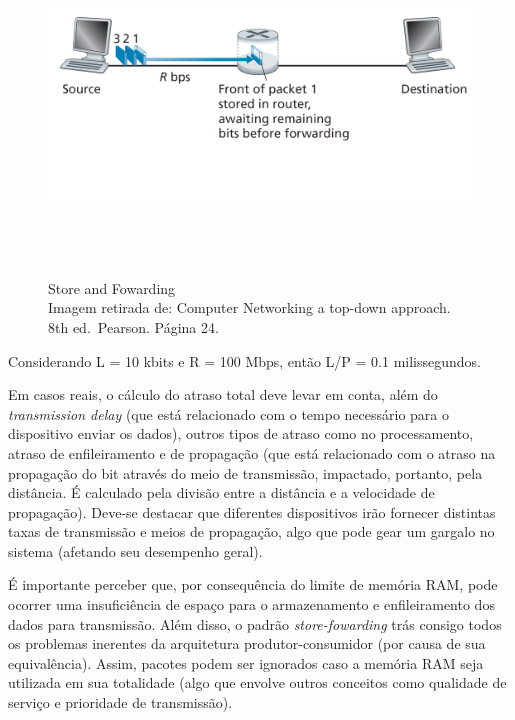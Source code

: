 \begin{figure}[h!]
\centering
\includegraphics[keepaspectratio, width=12cm, height=9cm]{imagens/08/08 - store-and-forwarding.png}
\caption{Store and Fowarding \\
Imagem retirada de: Computer Networking a top-down approach. 8th
ed.~Pearson. Página 24. \\}
\label{fig:Store and Fowarding}
\end{figure}



Considerando L = 10 kbits e R = 100 Mbps, então L/P = 0.1 milissegundos.

Em casos reais, o cálculo do atraso total deve levar em conta, além do
\emph{transmission delay} (que está relacionado com o tempo necessário
para o dispositivo enviar os dados), outros tipos de atraso como no
processamento, atraso de enfileiramento e de propagação (que está
relacionado com o atraso na propagação do bit através do meio de
transmissão, impactado, portanto, pela distância. É calculado pela
divisão entre a distância e a velocidade de propagação). Deve-se
destacar que diferentes dispositivos irão fornecer distintas taxas de
transmissão e meios de propagação, algo que pode gear um gargalo no
sistema (afetando seu desempenho geral).

É importante perceber que, por consequência do limite de memória RAM,
pode ocorrer uma insuficiência de espaço para o armazenamento e
enfileiramento dos dados para transmissão. Além disso, o padrão
\emph{store-fowarding} trás consigo todos os problemas inerentes da
arquitetura produtor-consumidor (por causa de sua equivalência). Assim,
pacotes podem ser ignorados caso a memória RAM seja utilizada em sua
totalidade (algo que envolve outros conceitos como qualidade de serviço
e prioridade de transmissão).

